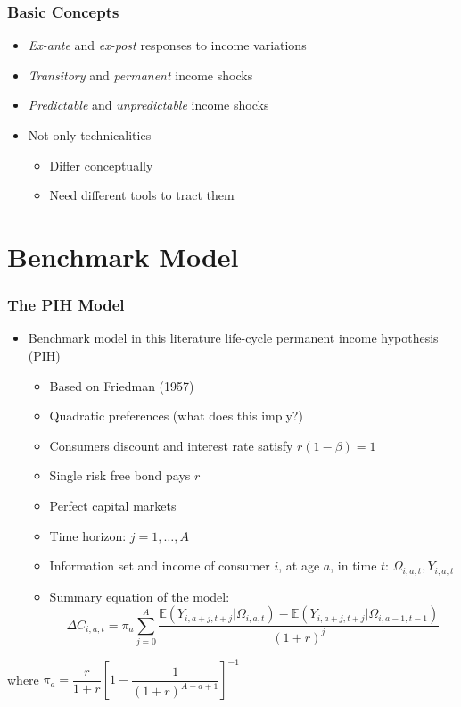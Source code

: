 \begin{frame}
	\frametitle{Basic Concepts}
\begin{itemize}
	\item \textit{Ex-ante} and \textit{ex-post} responses to income variations
	\item \textit{Transitory} and \textit{permanent} income shocks
	\item \textit{Predictable} and \textit{unpredictable} income shocks
	\item Not only technicalities
		\begin{itemize}
			\item Differ conceptually
			\item Need different tools to tract them
		\end{itemize}
\end{itemize}
\end{frame}

\section{Benchmark Model}

\begin{frame}
	\frametitle{The PIH Model}
		\begin{itemize}
			\item Benchmark model in this literature life-cycle permanent income hypothesis (PIH)
			\begin{itemize}
				\item Based on Friedman (1957)
				\item Quadratic preferences (what does this imply?)
				\item Consumers discount and interest rate satisfy $r(1 - \beta) = 1$
				\item Single risk free bond pays $r$
				\item Perfect capital markets
				\item Time horizon: $j = 1, \ldots, A$
				\item Information set and income of consumer $i$, at age $a$, in time $t$: $\Omega_{i,a,t}, Y_{i,a,t}$
				\item Summary equation of the model:
				\begin{equation}
				\Delta C_{i,a,t} = \pi_{a} \sum \limits _{j=0} ^{A} \frac{\mathbb{E}\left( Y_{i,a+j,t+j}| \Omega_{i,a,t}\right) - \mathbb{E}\left( Y_{i,a+j,t+j}| \Omega_{i,a-1,t-1}\right)}{(1+r)^j} \nonumber
				\end{equation}
			\end{itemize}
		\end{itemize}
\noindent where $\pi_{a}=\dfrac{r}{1+r} \left[ 1-\dfrac{1}{(1+r)^{A-a+1}} \right]^{-1}$
\end{frame}

